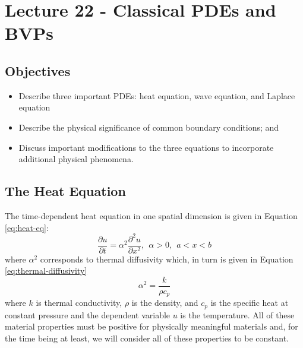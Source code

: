 \chapter{Lecture 22 - Classical PDEs and BVPs}
\label{ch:lec22}
\section{Objectives}
\begin{itemize}
\item Describe three important PDEs: heat equation, wave equation, and Laplace equation
\item Describe the physical significance of common boundary conditions; and
\item Discuss important modifications to the three equations to incorporate additional physical phenomena.
\end{itemize}

\section{The Heat Equation}
The time-dependent heat equation in one spatial dimension is given in Equation \ref{eq:heat-eq}:
\begin{equation}
\frac{\partial u}{\partial t} = \alpha^2\frac{\partial^2 u}{\partial x^2}, \ \ \alpha > 0, \ \ a<x<b
\label{eq:heat-eq}
\end{equation}
where $\alpha^2$ corresponds to thermal diffusivity which, in turn is given in Equation \ref{eq:thermal-diffusivity}
\begin{equation}
\alpha^2 = \frac{k}{\rho c_p}
\label{eq:thermal-diffusivity}
\end{equation}
where $k$ is thermal conductivity, $\rho$ is the density, and $c_p$ is the specific heat at constant pressure and the dependent variable $u$ is the temperature.  All of these material properties must be positive for physically meaningful materials and, for the time being at least, we will consider all of these properties to be constant.

